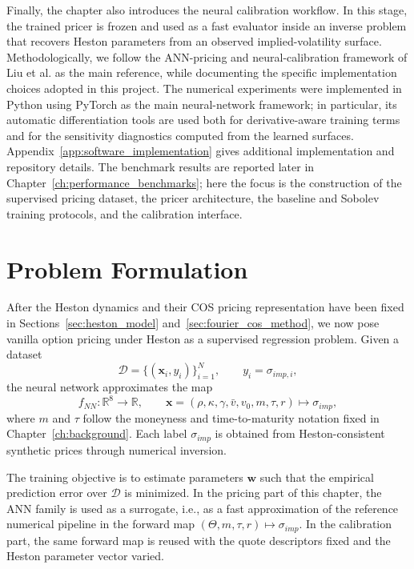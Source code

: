 Finally, the chapter also introduces the neural calibration workflow. In this stage, the trained pricer is frozen and used as a fast evaluator inside an inverse problem that recovers Heston parameters from an observed implied-volatility surface. Methodologically, we follow the ANN-pricing and neural-calibration framework of Liu et al. \cite{liu} as the main reference, while documenting the specific implementation choices adopted in this project. The numerical experiments were implemented in Python using PyTorch as the main neural-network framework; in particular, its automatic differentiation tools are used both for derivative-aware training terms and for the sensitivity diagnostics computed from the learned surfaces. Appendix~\ref{app:software_implementation} gives additional implementation and repository details. The benchmark results are reported later in Chapter~\ref{ch:performance_benchmarks}; here the focus is the construction of the supervised pricing dataset, the pricer architecture, the baseline and Sobolev training protocols, and the calibration interface.

\section{Problem Formulation}
\label{sec:ann_problem_formulation}

After the Heston dynamics and their COS pricing representation have been fixed in Sections~\ref{sec:heston_model} and~\ref{sec:fourier_cos_method}, we now pose vanilla option pricing under Heston as a supervised regression problem. Given a dataset
\[
\mathcal{D}=\{(\mathbf{x}_i,y_i)\}_{i=1}^{N},\qquad
y_i=\sigma_{imp,i},
\]
the neural network approximates the map
\[
f_{NN}:\mathbb{R}^{8}\to\mathbb{R}, \qquad
\mathbf{x}=(\rho,\kappa,\gamma,\bar v,v_0,m,\tau,r)\mapsto \sigma_{imp},
\]
where $m$ and $\tau$ follow the moneyness and time-to-maturity notation fixed in Chapter~\ref{ch:background}. Each label $\sigma_{imp}$ is obtained from Heston-consistent synthetic prices through numerical inversion.

The training objective is to estimate parameters $\mathbf{w}$ such that the empirical prediction error over $\mathcal{D}$ is minimized. In the pricing part of this chapter, the ANN family is used as a surrogate, i.e., as a fast approximation of the reference numerical pipeline in the forward map $(\Theta,m,\tau,r)\mapsto \sigma_{imp}$. In the calibration part, the same forward map is reused with the quote descriptors fixed and the Heston parameter vector varied.

